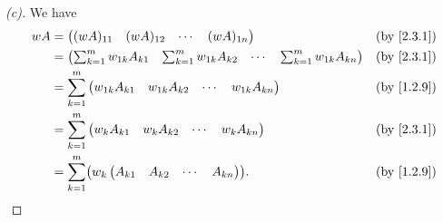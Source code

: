 \begin{proof}[(c)]
  We have
  \begin{align*}
    wA & = \begin{pmatrix}
             (wA)_{1 1} & (wA)_{1 2} & \cdots & (wA)_{1 n}
           \end{pmatrix}                                                             &  & \by{2.3.1}                                \\
       & = \begin{pmatrix}
             \sum_{k = 1}^m w_{1 k} A_{k 1} & \sum_{k = 1}^m w_{1 k} A_{k 2} & \cdots & \sum_{k = 1}^m w_{1 k} A_{k n}
           \end{pmatrix} &  & \by{2.3.1}                \\
       & = \sum_{k = 1}^m \begin{pmatrix}
                            w_{1 k} A_{k 1} & w_{1 k} A_{k 2} & \cdots & w_{1 k} A_{k n}
                          \end{pmatrix}                                              &  & \by{1.2.9}                                \\
       & = \sum_{k = 1}^m \begin{pmatrix}
                            w_k A_{k 1} & w_k A_{k 2} & \cdots & w_k A_{k n}
                          \end{pmatrix}                                                          &  & \by{2.3.1}                    \\
       & = \sum_{k = 1}^m \pa{w_k \begin{pmatrix}
                                      A_{k 1} & A_{k 2} & \cdots & A_{k n}
                                    \end{pmatrix}}.                                                                   &  & \by{1.2.9} \\
  \end{align*}
\end{proof}

